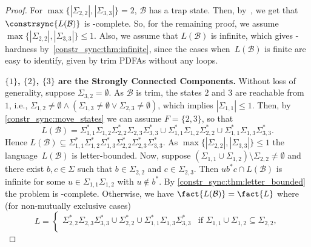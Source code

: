 \begin{proof} For $\max\{ |\Sigma_{2,2}|, |\Sigma_{3,3}| \} = 2$, $\mathcal B$ has a trap state.
	Then, by~,
	we get that $\constrsync{L(\mathcal B)}$
	is \NL-complete.
	So, for the remaining proof,
	we assume $\max\{ |\Sigma_{2,2}|, |\Sigma_{3,3}| \} \le 1$.
	Also, we  assume that $L(\mathcal B)$ is infinite,
	which gives \LOGSPACE-hardness by~\cref{constr_sync:thm:infinite},
	since the cases when~$L(\mathcal B)$ is finite are easy to
	identify, given by trim PDFAs without any loops.	
	
\medskip 
\noindent\textbf{\texorpdfstring{$\{1\}$, $\{2\}$, $\{3\}$}{\{1\},\{2\},\{3\}} are the Strongly Connected Components.}
Without loss of generality, suppose $\Sigma_{3,2} = \emptyset$.
As $\mathcal B$ 
is trim, the states $2$ and $3$ are reachable from~$1$, 
i.e., $\Sigma_{1,2} \ne \emptyset \land ( \Sigma_{1,3} \ne \emptyset \lor \Sigma_{2,3} \ne \emptyset)$, which
implies $|\Sigma_{1,1}|\le 1$.
Then, by \cref{constr_sync:move_states}
we can assume $F = \{2,3\}$, so that
\begin{equation}\label{constrsync:eqn:threestatesSCC}
	L(\mathcal B) = \Sigma_{1,1}^* \Sigma_{1,2} \Sigma_{2,2}^* \Sigma_{2,3} \Sigma_{3,3}^* \cup \Sigma_{1,1}^* \Sigma_{1,2} \Sigma_{2,2}^*
	\cup \Sigma_{1,1}^* \Sigma_{1,3} \Sigma_{3,3}^*. 
\end{equation}
Hence
$L(\mathcal B) \subseteq \Sigma_{1,1}^*\Sigma_{1,2}^* \Sigma_{1,3}^* \Sigma_{2,2}^* \Sigma_{2,3}^* \Sigma_{3,3}^*$.
As $\max\{ |\Sigma_{2,2}|, |\Sigma_{3,3}| \} \le 1$
the language~$L(\mathcal B)$ is letter-bounded.
Now, suppose $( \Sigma_{1,1} \cup \Sigma_{1,2} ) \setminus \Sigma_{2,2} \ne \emptyset$
and there exist $b,c \in \Sigma$ such that 
$b \in \Sigma_{2,2}$ and $c \in \Sigma_{2,3}$.
Then $ub^*c \cap L(\mathcal B)$ is infinite for some
$u \in \Sigma_{1,1}\Sigma_{1,2}$ with $u \notin b^*$.
By \cref{constr_sync:thm:letter_bounded} 
the problem  is \NP-complete.
Otherwise, we have $\fact{L(\mathcal B)} = \fact{L}$
where (for non-mutually exclusive cases)
\[
L = \begin{cases}
	\Sigma_{2,2}^* \Sigma_{2,3} \Sigma_{3,3}^* \cup \Sigma_{2,2}^* \cup \Sigma_{1,1}^* \Sigma_{1,3} \Sigma_{3,3}^*
	& \text{if } \Sigma_{1,1} \cup \Sigma_{1,2} \subseteq \Sigma_{2,2}, \\ %

\end{cases}\]
\end{proof}
